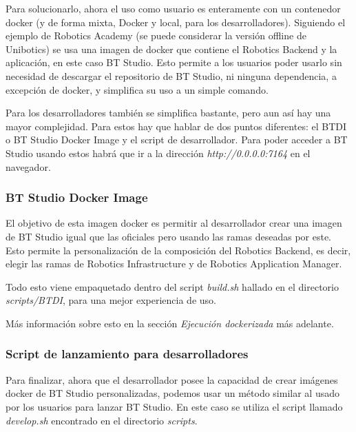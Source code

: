 Para solucionarlo, ahora el uso como usuario es enteramente con un contenedor docker (y de forma mixta, Docker y local, para los desarrolladores). Siguiendo el ejemplo de Robotics Academy (se puede considerar la versión offline de Unibotics) se usa una imagen de docker que contiene el Robotics Backend y la aplicación, en este caso BT Studio. Esto permite a los usuarios poder usarlo sin necesidad de descargar el repositorio de BT Studio, ni ninguna dependencia, a excepción de docker, y simplifica su uso a un simple comando.



Para los desarrolladores también se simplifica bastante, pero aun así hay una mayor complejidad. Para estos hay que hablar de dos puntos diferentes: el BTDI o BT Studio Docker Image y el script de desarrollador. Para poder acceder a BT Studio usando estos habrá que ir a la dirección \textit{http://0.0.0.0:7164} en el navegador.

\subsubsection{BT Studio Docker Image}

El objetivo de esta imagen docker es permitir al desarrollador crear una imagen de BT Studio igual que las oficiales pero usando las ramas deseadas por este. Esto permite la personalización de la composición del Robotics Backend, es decir, elegir las ramas de Robotics Infrastructure y de Robotics Application Manager.

Todo esto viene empaquetado dentro del script \textit{build.sh} hallado en el directorio \textit{scripts/BTDI}, para una mejor experiencia de uso.

Más información sobre esto en la sección \textit{Ejecución dockerizada} más adelante.

\subsubsection{Script de lanzamiento para desarrolladores}

Para finalizar, ahora que el desarrollador posee la capacidad de crear imágenes docker de BT Studio personalizadas, podemos usar un método similar al usado por los usuarios para lanzar BT Studio. En este caso se utiliza el script llamado \textit{develop.sh} encontrado en el directorio \textit{scripts}.

